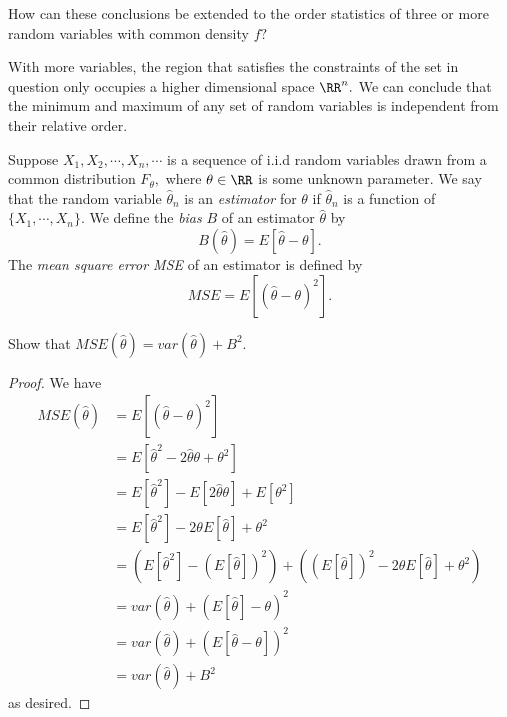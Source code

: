 \documentclass{article}
\begin{document}
\begin{enumerate}
\begin{enumerate}
			

		\ii How can these conclusions be extended to the order statistics of three or more random variables with common density $f?$
			\begin{soln}
				With more variables, the region that satisfies the constraints of the set in question only occupies a higher dimensional space $\RR^n.$ We can conclude that the minimum and maximum of any set of random variables is independent from their relative order.
			\end{soln}
	\end{enumerate}

	\newpage

	\ii Suppose $X_1, X_2, \cdots, X_n, \cdots$ is a sequence of i.i.d random variables drawn from a common distribution $F_\theta,$ where $\theta\in\RR$ is some unknown parameter. We say that the random variable $\hat{\theta}_n$ is an \textit{estimator} for $\theta$ if $\hat{\theta}_n$ is a function of $\{X_1, \cdots, X_n\}.$ We define the \textit{bias} $B$ of an estimator $\hat{\theta}$ by \[B(\hat{\theta})=E[\hat{\theta}-\theta]. \] The \textit{mean square error MSE} of an estimator is defined by \[MSE = E\left[ (\hat{\theta}-\theta)^2 \right]. \] 

	\begin{enumerate}
			\ii Show that $MSE(\hat{\theta})=var(\hat{\theta})+B^2.$
				\begin{proof}
					We have
					\begin{align*}
						MSE(\hat{\theta}) &= E\left[ (\hat{\theta}-\theta)^2 \right] \\
						&= E[ \hat{\theta}^2-2\hat{\theta}\theta+\theta^2 ] \\
						&= E[ \hat{\theta}^2 ] - E[2\hat{\theta}\theta] + E[ \theta^2] \\
						&= E[ \hat{\theta}^2] - 2\theta E[\hat{\theta}] + \theta^2 \\
						&= \left(E[\hat{\theta}^2]-(E[\hat{\theta}])^2\right) + \left((E[\hat{\theta}])^2 -2\theta E[\hat{\theta}] + \theta^2\right) \\
						&= var(\hat{\theta}) + (E[\hat{\theta}]-\theta)^2 \\
						&= var(\hat{\theta})+(E[\hat{\theta}-\theta])^2 \\
						&= var(\hat{\theta}) + B^2
					\end{align*} as desired.
				\end{proof}


\end{enumerate}
\end{enumerate}
\end{document}
